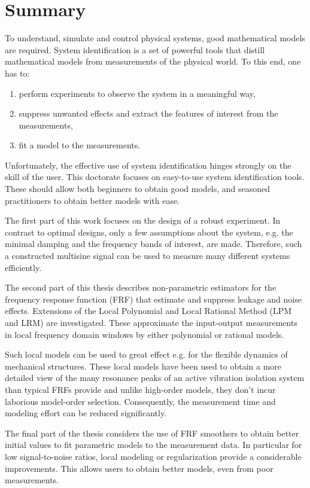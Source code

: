 \chapter{Summary}
\NoThumbs
To understand, simulate and control physical systems, good mathematical models are required. 
System identification is a set of powerful tools that distill mathematical models from measurements of the physical world. 
To this end, one has to:
\begin{enumerate}
\item perform experiments to observe the system in a meaningful way,
\item suppress unwanted effects and extract the features of interest from the measurements,
\item fit a model to the measurements.
\end{enumerate}

Unfortunately, the effective use of system identification hinges strongly on the skill of the user. This doctorate focuses on easy-to-use system identification tools. 
These should allow both beginners to obtain good models, and seasoned practitioners to obtain better models with ease.

The first part of this work focuses on the design of a robust experiment. 
In contrast to optimal designs, only a few assumptions about the system, e.g. the minimal damping and the frequency bands of interest, are made. 
Therefore, such a constructed multisine signal can be used to measure many different systems efficiently.

The second part of this thesis describes non-parametric estimators for the frequency response function (FRF) that estimate and suppress leakage and noise effects. 
Extensions of the Local Polynomial and Local Rational Method (LPM and LRM) are investigated. These approximate the input-output measurements in local frequency domain windows by either polynomial or rational models.

Such local models can be used to great effect e.g. for the flexible dynamics of mechanical structures.
 These local models have been used to obtain a more detailed view of the many resonance peaks of an active vibration isolation system than typical FRFs provide and unlike high-order models, they don’t incur laborious model-order selection.
Consequently, the measurement time and modeling effort can be reduced significantly.

The final part of the thesis considers the use of FRF smoothers to obtain better initial values to fit parametric models to the measurement data. 
In particular for low signal-to-noise ratios, local modeling or regularization provide a considerable improvements. 
This allows users to obtain better models, even from poor measurements.
